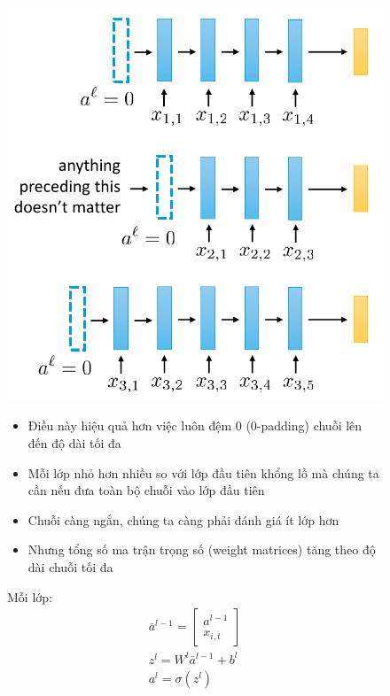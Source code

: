 \documentclass{book}
\begin{document}
\begin{figure}[H]
    \centering
    \begin{minipage}[c]{0.35\textwidth}
        \centering
        \includegraphics[width=\textwidth]{images/variable_layer_count.png}
    \end{minipage}\hfill
    \begin{minipage}[c]{0.35\textwidth}
        \begin{itemize}
            \item[] Điều này hiệu quả hơn việc luôn đệm 0 (0-padding) chuỗi lên đến độ dài tối đa
            \item[] Mỗi lớp nhỏ hơn nhiều so với lớp đầu tiên khổng lồ mà chúng ta cần nếu đưa toàn bộ chuỗi vào lớp đầu tiên
            \item[] Chuỗi càng ngắn, chúng ta càng phải đánh giá ít lớp hơn
            \item[] Nhưng tổng số ma trận trọng số (weight matrices) tăng theo độ dài chuỗi tối đa
        \end{itemize}
    \end{minipage}\hfill
        \begin{minipage}[c]{0.2\textwidth}
            Mỗi lớp:
            \begin{equation*}
                \begin{aligned}
            \bar{a}^{l-1}=\begin{bmatrix}
                a^{l-1} \\
                x_{i,t}
            \end{bmatrix} \\ z^l=W^l\bar{a}^{l-1}+b^l \\ a^l=\sigma(z^l)
        \end{aligned}
        \end{equation*}
    \end{minipage}
\end{figure}
\end{document}
